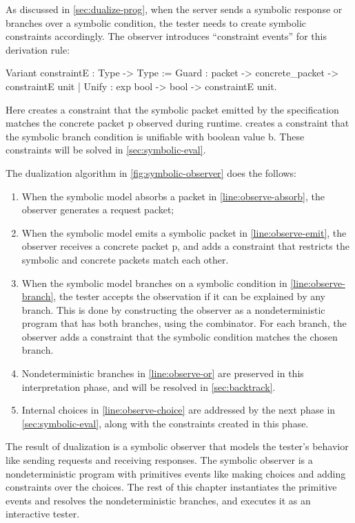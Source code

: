 As discussed in \autoref{sec:dualize-prog}, when the server sends a symbolic
response or branches over a symbolic condition, the tester needs to create
symbolic constraints accordingly.  The observer introduces ``constraint events''
for this derivation rule:
\begin{coq}
  Variant constraintE : Type -> Type :=
    Guard : packet -> concrete_packet -> constraintE unit
  | Unify : exp bool -> bool -> constraintE unit.
\end{coq}

Here  creates a constraint that the symbolic packet 
emitted by the specification matches the concrete packet \ilc p observed during
runtime.   creates a constraint that the symbolic branch
condition  is unifiable with boolean value \ilc b.  These constraints
will be solved in \autoref{sec:symbolic-eval}.

The dualization algorithm in \autoref{fig:symbolic-observer} does the follows:
\begin{enumerate}
  \item When the symbolic model absorbs a packet in
    \autoref{line:observe-absorb}, the observer generates a request packet;
  \item When the symbolic model emits a symbolic packet  in
    \autoref{line:observe-emit}, the observer receives a concrete packet \ilc p,
    and adds a constraint that restricts the symbolic and concrete packets match
    each other.
  \item When the symbolic model branches on a symbolic condition  in
    \autoref{line:observe-branch}, the tester accepts the observation if it can
    be explained by any branch.  This is done by constructing the observer as a
    nondeterministic program that has both branches, using the 
    combinator.  For each branch, the observer adds a constraint that the
    symbolic condition matches the chosen branch.
  \item Nondeterministic branches in \autoref{line:observe-or} are preserved in
    this interpretation phase, and will be resolved in \autoref{sec:backtrack}.
  \item Internal choices in \autoref{line:observe-choice} are addressed by the
    next phase in \autoref{sec:symbolic-eval}, along with the constraints
    created in this phase.
\end{enumerate}

The result of dualization is a symbolic observer that models the tester's
behavior like sending requests and receiving responses.  The symbolic observer
is a nondeterministic program with primitives events like making choices and
adding constraints over the choices.  The rest of this chapter instantiates the
primitive events and resolves the nondeterministic branches, and executes it as
an interactive tester.

